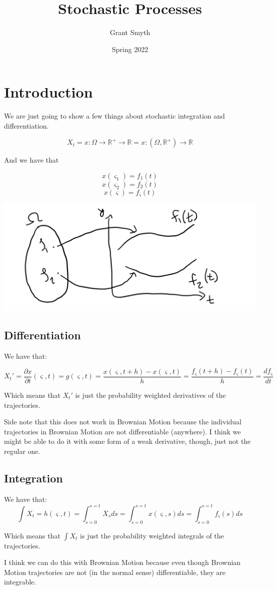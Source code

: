 \documentclass{article}
\title{Stochastic Processes}
\author{Grant Smyth }
\date{Spring 2022}
\begin{document}
\maketitle

\section{Introduction}
We are just going to show a few things about stochastic integration and differentiation.

$$X_t = x : \Omega \rightarrow \mathbb{R}^+ \rightarrow  \mathbb{R} = x :  \left(\Omega  , \mathbb{R}^+\right)\rightarrow  \mathbb{R}$$ 

And we have that

$$x(\varsigma_1) = f_1(t)$$
$$x(\varsigma_2) = f_2(t)$$
$$x(\varsigma) = f_\varsigma(t)$$

\includegraphics[width=\textwidth]{stochastic_ image.png}

\newpage

\subsection{Differentiation}
We have that:

$$X_t' = \frac{\partial x}{\partial t}\left(\varsigma, t\right)=g\left(\varsigma, t\right) = \frac{x\left(\varsigma, t + h\right) - x\left(\varsigma, t\right)}{h} = \frac{f_\varsigma\left(t + h\right) - f_\varsigma\left(t\right)}{h} = \frac{df_\varsigma}{dt}$$

Which means that $X_t'$ is just the probability weighted derivatives of the trajectories.

Side note that this does not work in Brownian Motion because the individual trajectories in Brownian Motion are not differentiable (anywhere).  I think we might be able to do it with some form of a weak derivative, though, just not the regular one.

\subsection{Integration}
We have that:
$$\int X_t = h\left(\varsigma,t\right)= \int_{s = 0}^{s = t} X_s ds = \int_{s = 0}^{s = t} x\left(\varsigma,s\right) ds = \int_{s = 0}^{s = t} f_\varsigma\left(s\right) ds $$

Which means that $\int X_t$ is just the probability weighted integrals of the trajectories.

I think we can do this with Brownian Motion because even though Brownian Motion trajectories are not (in the normal sense) differentiable, they are integrable.
\end{document}
